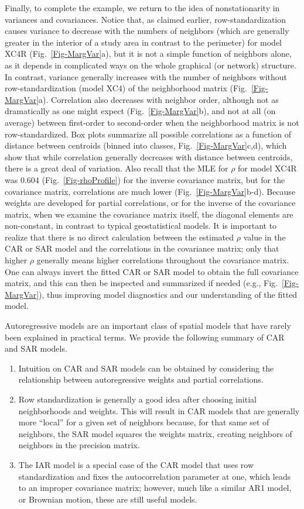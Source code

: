 Finally, to complete the example, we return to the idea of nonstationarity in variances and covariances.  Notice that, as claimed earlier, row-standardization causes variance to decrease with the numbers of neighbors (which are generally greater in the interior of a study area in contrast to the perimeter) for model XC4R (Fig.~\ref{Fig-MargVar}a), but it is not a simple function of neighbors alone, as it depends in complicated ways on the whole graphical (or network) structure.  In contrast, variance generally increases with the number of neighbors without row-standardization (model XC4) of the neighborhood matrix (Fig.~\ref{Fig-MargVar}a). Correlation also decreases with neighbor order, although not as dramatically as one might expect (Fig.~\ref{Fig-MargVar}b), and not at all (on average) between first-order to second-order when the neighborhood matrix is not row-standardized. Box plots summarize all possible correlations as a function of distance between centroids (binned into classes, Fig.~\ref{Fig-MargVar}c,d), which show that while correlation generally decreases with distance between centroids, there is a great deal of variation. Also recall that the MLE for $\rho$ for model XC4R was 0.604 (Fig.~\ref{Fig-rhoProfile}) for the inverse covariance matrix, but for the covariance matrix, correlations are much lower (Fig.~\ref{Fig-MargVar}b-d). Because weights are developed for partial correlations, or for the inverse of the covariance matrix, when we examine the covariance matrix itself, the diagonal elements are non-constant, in contrast to typical geostatistical models. It is important to realize that there is no direct calculation between the estimated $\rho$ value in the CAR or SAR model and the correlations in the covariance matrix; only that higher $\rho$ generally means higher correlations throughout the covariance matrix. One can always invert the fitted CAR or SAR model to obtain the full covariance matrix, and this can then be inspected and summarized if needed (e.g., Fig.~\ref{Fig-MargVar}), thus improving model diagnostics and our understanding of the fitted model.

Autoregressive models are an important class of spatial models that have rarely been explained in practical terms. We provide the following summary of CAR and SAR models.
\begin{enumerate}
 \item Intuition on CAR and SAR models can be obtained by considering the relationship between
autoregressive weights and partial correlations.
 \item Row standardization is generally a good idea after choosing initial neighborhoods and weights. This will result in CAR models that are generally more “local” for a given set of neighbors because, for that same set of neighbors, the SAR model squares the weights matrix, creating neighbors of neighbors in the precision matrix.
 \item The IAR model is a special case of the CAR model that uses row standardization and fixes the autocorrelation parameter at one, which leads to an improper covariance matrix; however, much like a similar AR1 model, or Brownian motion, these are still useful models.
\end{enumerate}


